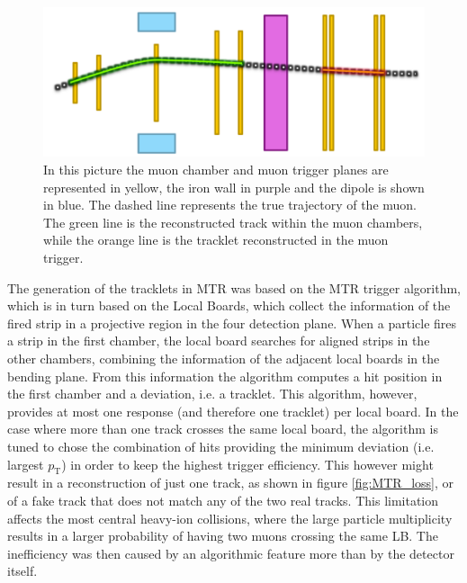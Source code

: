 \begin{figure}[!ht]
\begin{center}
\includegraphics[width=0.9\linewidth]{Chapters/O2/Figs/MTR_logic.pdf}
\caption{In this picture the muon chamber and muon trigger planes are represented in yellow, the iron wall in purple and the dipole is shown in blue. The dashed line represents the true trajectory of the muon. The green line is the reconstructed track within the muon chambers, while the orange line is the tracklet reconstructed in the muon trigger.}
\label{fig:MTR_old}
\end{center}
\end{figure}

The generation of the tracklets in MTR was based on the MTR trigger algorithm, which is in turn based on the Local Boards, which collect the information of the fired strip in a projective region in the four detection plane. 
When a particle fires a strip in the first chamber, the local board searches for aligned strips in the other chambers, combining the information of the adjacent  local boards in the bending plane. From this information the algorithm computes a hit position in the first chamber and a deviation, i.e. a tracklet.
This algorithm, however, provides at most one response (and therefore one tracklet) per local board. In the case where more than one track crosses the same local board, the algorithm is tuned to chose the combination of hits providing the minimum deviation (i.e. largest $p_\mathrm{T}$) in order to keep the highest trigger efficiency. 
This however might result in a reconstruction of just one track, as shown in figure \ref{fig:MTR_loss}, or of a fake track that does not match any of the two real tracks.
This limitation affects the most central heavy-ion collisions, where the large particle multiplicity results in a larger probability of having two muons crossing the same LB.
The inefficiency was then caused by an algorithmic feature more than by the detector itself.

